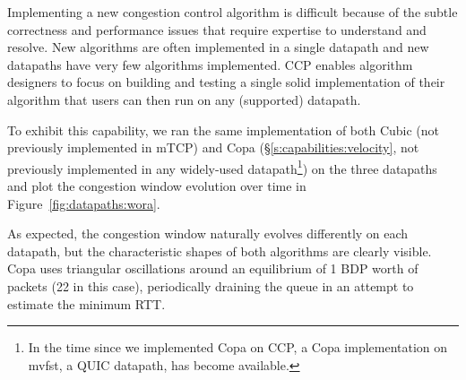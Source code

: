 Implementing a new congestion control algorithm is difficult because of the subtle correctness and performance issues that require expertise to understand and resolve. New algorithms are often implemented in a single datapath and new datapaths have very few algorithms implemented. 
CCP enables algorithm designers to focus on building and testing a single solid implementation of their algorithm that users can then run on any (supported) datapath. 

To exhibit this capability, we ran the same implementation of both Cubic (not previously implemented in mTCP) and Copa (\S\ref{s:capabilities:velocity}, not previously implemented in any widely-used datapath\footnote{In the time since we implemented Copa on CCP, a Copa implementation on mvfst, a QUIC datapath, has become available.}) on the three datapaths and plot the congestion window evolution over time in Figure~\ref{fig:datapaths:wora}.

As expected, the congestion window naturally evolves differently on each datapath, but the characteristic shapes of both algorithms are clearly visible. Copa uses triangular oscillations around an equilibrium of 1 BDP worth of packets (22 in this case), periodically draining the queue in an attempt to estimate the minimum RTT.
